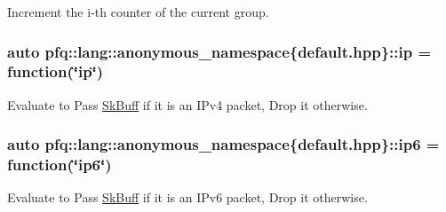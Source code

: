 Increment the i-\/th counter of the current group. 

\subsubsection[{\texorpdfstring{ip}{ip}}]{\setlength{\rightskip}{0pt plus 5cm}auto pfq\+::lang\+::anonymous\+\_\+namespace\{default.\+hpp\}\+::ip = {\bf function}(\char`\"{}ip\char`\"{})}\hypertarget{namespacepfq_1_1lang_1_1anonymous__namespace_02default_8hpp_03_a738d1b52bf88feb4f7b1a17b97cdc8df}{}\label{namespacepfq_1_1lang_1_1anonymous__namespace_02default_8hpp_03_a738d1b52bf88feb4f7b1a17b97cdc8df}


Evaluate to {\ttfamily Pass} \hyperlink{structpfq_1_1lang_1_1SkBuff}{Sk\+Buff} if it is an I\+Pv4 packet, {\ttfamily Drop} it otherwise. 

\subsubsection[{\texorpdfstring{ip6}{ip6}}]{\setlength{\rightskip}{0pt plus 5cm}auto pfq\+::lang\+::anonymous\+\_\+namespace\{default.\+hpp\}\+::ip6 = {\bf function}(\char`\"{}ip6\char`\"{})}\hypertarget{namespacepfq_1_1lang_1_1anonymous__namespace_02default_8hpp_03_a5df1535f3c8090b714928b77f5a9cf18}{}\label{namespacepfq_1_1lang_1_1anonymous__namespace_02default_8hpp_03_a5df1535f3c8090b714928b77f5a9cf18}


Evaluate to {\ttfamily Pass} \hyperlink{structpfq_1_1lang_1_1SkBuff}{Sk\+Buff} if it is an I\+Pv6 packet, {\ttfamily Drop} it otherwise. 

